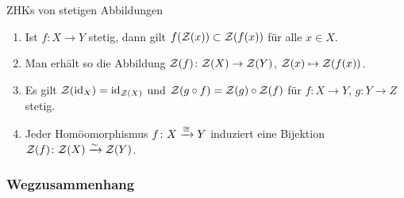 \begin{Satz}{ZHKs von stetigen Abbildungen}
    \begin{enumerate}
        \item
        Ist $f\colon X \rightarrow Y$ stetig, dann gilt
        $f(\mathcal{Z}(x)) \subset \mathcal{Z}(f(x))$ für alle $x \in X$.

        \item
        Man erhält so die Abbildung
        $\mathcal{Z}(f)\colon \mathcal{Z}(X) \rightarrow \mathcal{Z}(Y)$,
        $\mathcal{Z}(x) \mapsto \mathcal{Z}(f(x))$.

        \item
        Es gilt $\mathcal{Z}(\operatorname{id}_X) = \operatorname{id}_{\mathcal{Z}(X)}$ und
        $\mathcal{Z}(g \circ f) = \mathcal{Z}(g) \circ \mathcal{Z}(f)$ für
        $f\colon X \rightarrow Y$, $g\colon Y \rightarrow Z$ stetig.

        \item
        Jeder Homöomorphismus $f\colon X \xrightarrow{\cong} Y$ induziert eine Bijektion
        $\mathcal{Z}(f)\colon \mathcal{Z}(X) \xrightarrow{\sim} \mathcal{Z}(Y)$.
    \end{enumerate}
\end{Satz}

\subsubsection{%
    Wegzusammenhang%
}

